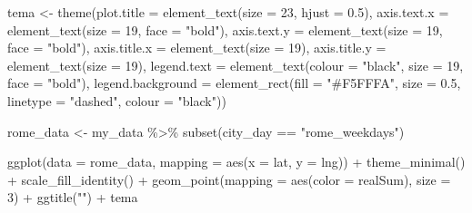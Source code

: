 \documentclass[
]{article}
\newenvironment{Shaded}{\begin{snugshade}}{\end{snugshade}}
\newcommand{\AttributeTok}[1]{\textcolor[rgb]{0.77,0.63,0.00}{#1}}
\newcommand{\DecValTok}[1]{\textcolor[rgb]{0.00,0.00,0.81}{#1}}
\newcommand{\FloatTok}[1]{\textcolor[rgb]{0.00,0.00,0.81}{#1}}
\newcommand{\FunctionTok}[1]{\textcolor[rgb]{0.00,0.00,0.00}{#1}}
\newcommand{\NormalTok}[1]{#1}
\newcommand{\OtherTok}[1]{\textcolor[rgb]{0.56,0.35,0.01}{#1}}
\newcommand{\SpecialCharTok}[1]{\textcolor[rgb]{0.00,0.00,0.00}{#1}}
\newcommand{\StringTok}[1]{\textcolor[rgb]{0.31,0.60,0.02}{#1}}
\begin{document}
\begin{Shaded}
\begin{Highlighting}[]
\NormalTok{tema }\OtherTok{\textless{}{-}} \FunctionTok{theme}\NormalTok{(}\AttributeTok{plot.title =} \FunctionTok{element\_text}\NormalTok{(}\AttributeTok{size =} \DecValTok{23}\NormalTok{, }\AttributeTok{hjust =} \FloatTok{0.5}\NormalTok{),}
    \AttributeTok{axis.text.x =} \FunctionTok{element\_text}\NormalTok{(}\AttributeTok{size =} \DecValTok{19}\NormalTok{, }\AttributeTok{face =} \StringTok{"bold"}\NormalTok{), }\AttributeTok{axis.text.y =} \FunctionTok{element\_text}\NormalTok{(}\AttributeTok{size =} \DecValTok{19}\NormalTok{,}
        \AttributeTok{face =} \StringTok{"bold"}\NormalTok{), }\AttributeTok{axis.title.x =} \FunctionTok{element\_text}\NormalTok{(}\AttributeTok{size =} \DecValTok{19}\NormalTok{),}
    \AttributeTok{axis.title.y =} \FunctionTok{element\_text}\NormalTok{(}\AttributeTok{size =} \DecValTok{19}\NormalTok{), }\AttributeTok{legend.text =} \FunctionTok{element\_text}\NormalTok{(}\AttributeTok{colour =} \StringTok{"black"}\NormalTok{,}
        \AttributeTok{size =} \DecValTok{19}\NormalTok{, }\AttributeTok{face =} \StringTok{"bold"}\NormalTok{), }\AttributeTok{legend.background =} \FunctionTok{element\_rect}\NormalTok{(}\AttributeTok{fill =} \StringTok{"\#F5FFFA"}\NormalTok{,}
        \AttributeTok{size =} \FloatTok{0.5}\NormalTok{, }\AttributeTok{linetype =} \StringTok{"dashed"}\NormalTok{, }\AttributeTok{colour =} \StringTok{"black"}\NormalTok{))}

\NormalTok{rome\_data }\OtherTok{\textless{}{-}}\NormalTok{ my\_data }\SpecialCharTok{\%\textgreater{}\%}
    \FunctionTok{subset}\NormalTok{(city\_day }\SpecialCharTok{==} \StringTok{"rome\_weekdays"}\NormalTok{)}

\FunctionTok{ggplot}\NormalTok{(}\AttributeTok{data =}\NormalTok{ rome\_data, }\AttributeTok{mapping =} \FunctionTok{aes}\NormalTok{(}\AttributeTok{x =}\NormalTok{ lat, }\AttributeTok{y =}\NormalTok{ lng)) }\SpecialCharTok{+} \FunctionTok{theme\_minimal}\NormalTok{() }\SpecialCharTok{+}
    \FunctionTok{scale\_fill\_identity}\NormalTok{() }\SpecialCharTok{+} \FunctionTok{geom\_point}\NormalTok{(}\AttributeTok{mapping =} \FunctionTok{aes}\NormalTok{(}\AttributeTok{color =}\NormalTok{ realSum),}
    \AttributeTok{size =} \DecValTok{3}\NormalTok{) }\SpecialCharTok{+} \FunctionTok{ggtitle}\NormalTok{(}\StringTok{""}\NormalTok{) }\SpecialCharTok{+}\NormalTok{ tema}
\end{Highlighting}
\end{Shaded}
\end{document}
